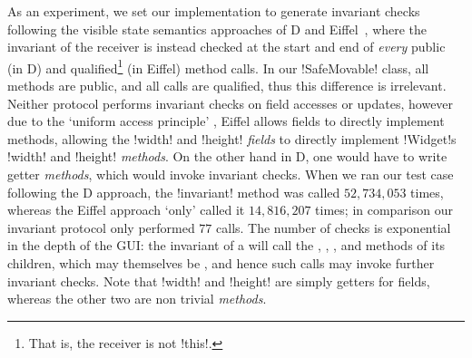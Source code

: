 As an experiment, we set our implementation to generate invariant checks following the  visible state semantics approaches of D and Eiffel~\cite{Alexandrescu:2010:DPL:1875434,DRef},
where the invariant of the receiver is instead checked at the start and end of \emph{every} 
public (in D) and qualified\footnote{That is, the receiver is not \Q!this!.} (in Eiffel) method calls.
In our \Q!SafeMovable! class, all methods are public, and all calls are qualified, thus this difference is irrelevant. Neither protocol performs invariant checks on field accesses or updates,
however due to the `uniform access principle'%
, Eiffel allows fields to directly implement methods, allowing the \Q!width! and \Q!height! \emph{fields} to directly implement \Q!Widget!s \Q!width! and \Q!height! \emph{methods}. On the other hand in D, one would have to write getter \emph{methods}, which would invoke invariant checks.
When we ran our test case following the D approach, the \Q!invariant! method was called $52,734,053$ times, whereas the Eiffel approach `only' called it $14,816,207$ times;%
in comparison our invariant protocol only performed $77$ calls. The number of checks is exponential in the depth of the GUI: the invariant of a \Q@SafeMovable@ will call the \Q@width@, \Q@height@, \Q@left@, and \Q@top@ methods of its children, which may themselves be \Q@SafeMovable@s, and hence such calls may invoke further invariant checks. Note that \Q!width! and \Q!height! are simply getters for fields, whereas the other two are non trivial \emph{methods}. %



